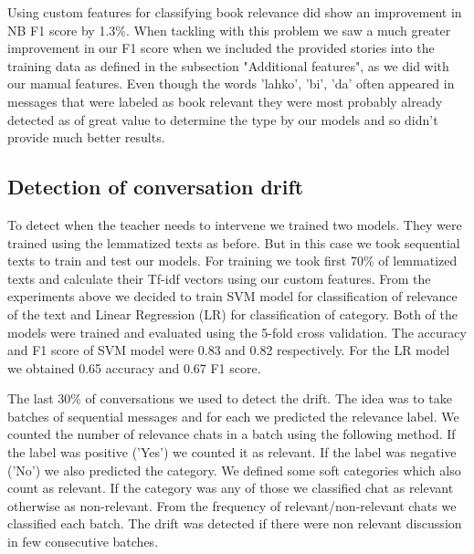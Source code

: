 \documentclass[11pt,a4paper]{article}
\begin{document}
Using custom features for classifying book relevance did show an improvement in NB F1 score by 1.3\%.
When tackling with this problem we saw a much greater improvement in our F1 score when we included the provided stories into the training data as defined in the subsection "Additional features", as we did with our manual features.
Even though the words 'lahko', 'bi', 'da' often appeared in messages that were labeled as book relevant they were most probably already detected as of great value to determine the type by our models and so didn't provide much better results.


\subsection{Detection of conversation drift}
To detect when the teacher needs to intervene we trained two models.
They were trained using the lemmatized texts as before.
But in this case we took sequential texts to train and test our models.
For training we took first 70\% of lemmatized texts and calculate their Tf-idf vectors using our custom features.
From the experiments above we decided to train SVM model for classification of relevance of the text and Linear Regression (LR) for classification of category.
Both of the models were trained and evaluated using the 5-fold cross validation.
The accuracy and F1 score of SVM model were 0.83 and 0.82 respectively.
For the LR model we obtained 0.65 accuracy and 0.67 F1 score.

The last 30\% of conversations we used to detect the drift.
The idea was to take batches of sequential messages and for each we predicted the relevance label.
We counted the number of relevance chats in a batch using the following method.
If the label was positive ('Yes') we counted it as relevant.
If the label was negative ('No') we also predicted the category.
We defined some soft categories which also count as relevant.
If the category was any of those we classified chat as relevant otherwise as non-relevant.
From the frequency of relevant/non-relevant chats we classified each batch.
The drift was detected if there were non relevant discussion in few consecutive batches.
\end{document}
